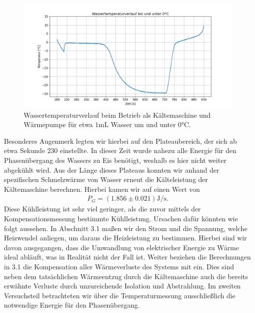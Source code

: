 \begin{figure}[H]
  \centering
  \includegraphics[width=.9\textwidth]{files/tempverlauf_unter0.png}
  \caption{Wassertemperaturverlauf beim Betrieb als Kältemaschine und Wärmepumpe für etwa $1 \si{\milli\liter}$ Wasser um und unter $0\si{\celsius}$.}
  \label{fig:tempverlauf_unter0}
\end{figure}

Besonderes Augenmerk legten wir hierbei auf den Plateaubereich, der sich ab etwa Sekunde $230$ einstellte. In dieser Zeit wurde nahezu alle Energie für den Phasenübergang des Wassers zu Eis benötigt, weshalb es hier nicht weiter abgekühlt wird. Aus der Länge dieses Plateaus konnten wir anhand der spezifischen Schmelzwärme von Wasser erneut die Kälteleistung der Kältemaschine berechnen. Hierbei kamen wir auf einen Wert von
\begin{align*}
  P_G = (1.856 \pm 0.021)\si{\joule\per\second}.
\end{align*}
Diese Kühlleistung ist sehr viel geringer, als die zuvor mittels der Kompensationsmessung bestimmte Kühlleistung. Ursachen dafür könnten wie folgt aussehen. In Abschnitt 3.1 maßen wir den Strom und die Spannung, welche Heizwendel anliegen, um daraus die Heizleistung zu bestimmen. Hierbei sind wir davon ausgegangen, dass die Umwandlung von elektrischer Energie zu Wärme ideal abläuft, was in Realität nicht der Fall ist. Weiter beziehen die Berechnungen in 3.1 die Kompensation aller Wärmeverluste des Systems mit ein. Dies sind neben dem tatsächlichen Wärmeentzug durch die Kältemaschine auch die bereits erwähnte Verluste durch unzureichende Isolation und Abstrahlung. Im zweiten Versuchsteil betrachteten wir über die Temperaturmessung ausschließlich die notwendige Energie für den Phasenübergang.


